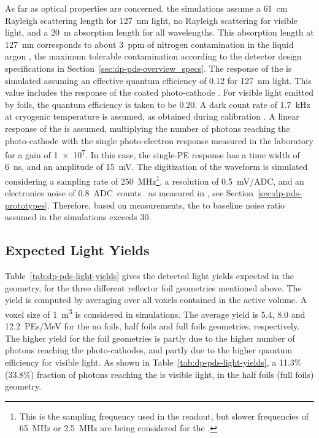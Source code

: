 As far as  optical properties are concerned, the simulations assume a \SI{61}{\cm} Rayleigh scattering length for \SI{127}{\nm} light, no Rayleigh scattering for visible light, and a \SI{20}{\m} absorption length for all wavelengths. This absorption length at \SI{127}{\nm} corresponds to about \SI{3}{ppm} of nitrogen contamination in the liquid argon \cite{Jones:2013bca}, the maximum tolerable contamination according to the detector design specifications in Section~\ref{sec:dp-pds-overview_specs}. The response of the  is simulated assuming an effective quantum efficiency of \num{0.12} for \SI{127}{\nm} light. This value includes the  response of the coated photo-cathode \cite{Bonesini:2018ubd}. For visible light emitted by  foils, the  quantum efficiency is taken to be \num{0.20}. A dark count rate of \SI{1.7}{\kilo\hertz} at cryogenic temperature is assumed, as obtained during   calibration \cite{Belver:2018erf}. A linear response of the  is assumed, multiplying the number of photons reaching the photo-cathode with the single photo-electron response measured in the laboratory for a gain of \num{1e7}. In this case, the single-PE response has a time width of \SI{6}{\nano\s}, and an amplitude of \SI{15}{mV}. The digitization of the waveform is simulated considering a sampling rate of \SI{250}{MHz}\footnote{This is the sampling frequency used in the  readout, but slower frequencies of \SI{65}{MHz} or \SI{2.5}{MHz} are being considered for the  .}, a resolution of \SI{0.5}{mV/ADC}, and an electronics noise of \SI{0.8}{ADC counts } as measured in , see Section~\ref{sec:dp-pds-prototypes}. Therefore, based on  measurements, the  to baseline noise  ratio assumed in the simulations exceeds \num{30}.


\subsection{Expected Light Yields}
\label{subsec:dp-pds-simulation_yields}

Table~\ref{tab:dp-pds-light-yields} gives the detected light yields expected in the \dune {} geometry, for the three different  reflector foil geometries mentioned above. The yield is computed by averaging over all \lar voxels contained in the  active volume. A voxel size of \SI{1}{\m^3} is considered in   simulations. The average yield is \num{5.4}, \num{8.0} and \SI{12.2}{PEs/MeV} for the no foils, half foils and full foils geometries, respectively. The higher yield for the foil geometries is partly due to the higher number of photons reaching the  photo-cathodes, and partly due to the higher  quantum efficiency for visible light. As shown in Table~\ref{tab:dp-pds-light-yields}, a 11.3\% (33.8\%) fraction of photons reaching the  is  visible light, in the half foils (full foils) geometry.

